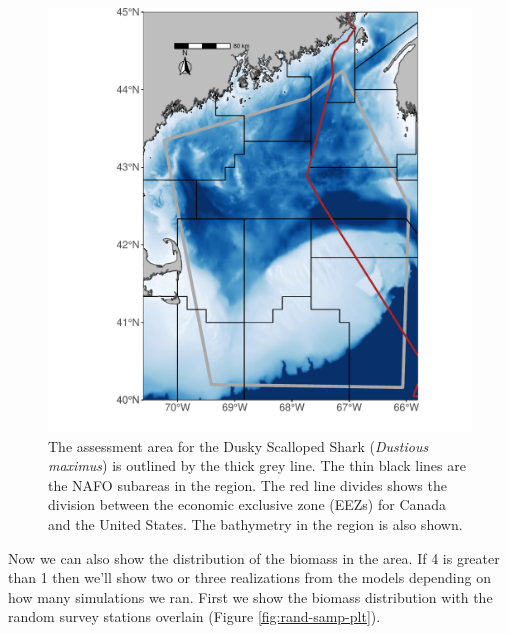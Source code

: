 \documentclass[
]{article}
\begin{document}
\begin{figure}
\centering
\includegraphics{Survey_tutortial_files/figure-latex/base-plt-1.pdf}
\caption{\label{fig:base-plt}The assessment area for the Dusky Scalloped Shark (\emph{Dustious maximus}) is outlined by the thick grey line. The thin black lines are the NAFO subareas in the region. The red line divides shows the division between the economic exclusive zone (EEZs) for Canada and the United States. The bathymetry in the region is also shown.}
\end{figure}

Now we can also show the distribution of the biomass in the area. If 4 is greater than 1 then we'll show two or three realizations from the models depending on how many simulations we ran. First we show the biomass distribution with the random survey stations overlain (Figure \ref{fig:rand-samp-plt}).
\end{document}
